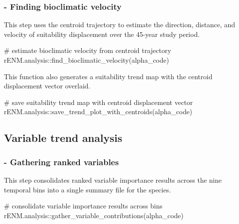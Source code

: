 \documentclass[
  letterpaper,
  DIV=11,
  numbers=noendperiod]{scrartcl}
\newenvironment{Shaded}{\begin{snugshade}}{\end{snugshade}}
\newcommand{\CommentTok}[1]{\textcolor[rgb]{0.37,0.37,0.37}{#1}}
\newcommand{\FunctionTok}[1]{\textcolor[rgb]{0.28,0.35,0.67}{#1}}
\newcommand{\NormalTok}[1]{\textcolor[rgb]{0.00,0.23,0.31}{#1}}
\newcommand{\SpecialCharTok}[1]{\textcolor[rgb]{0.37,0.37,0.37}{#1}}
\begin{document}
\subsubsection{- Finding bioclimatic
velocity}\label{finding-bioclimatic-velocity}

This step uses the centroid trajectory to estimate the direction,
distance, and velocity of suitability displacement over the 45-year
study period.

\begin{Shaded}
\begin{Highlighting}[]
\CommentTok{\# estimate bioclimatic velocity from centroid trajectory}
\NormalTok{rENM.analysis}\SpecialCharTok{::}\FunctionTok{find\_bioclimatic\_velocity}\NormalTok{(alpha\_code)}
\end{Highlighting}
\end{Shaded}

This function also generates a suitability trend map with the centroid
displacement vector overlaid.

\begin{Shaded}
\begin{Highlighting}[]
\CommentTok{\# save suitability trend map with centroid displacement vector}
\NormalTok{rENM.analysis}\SpecialCharTok{::}\FunctionTok{save\_trend\_plot\_with\_centroids}\NormalTok{(alpha\_code)}
\end{Highlighting}
\end{Shaded}

\subsection{Variable trend analysis}\label{variable-trend-analysis}

\subsubsection{- Gathering ranked
variables}\label{gathering-ranked-variables}

This step consolidates ranked variable importance results across the
nine temporal bins into a single summary file for the species.

\begin{Shaded}
\begin{Highlighting}[]
\CommentTok{\# consolidate variable importance results across bins}
\NormalTok{rENM.analysis}\SpecialCharTok{::}\FunctionTok{gather\_variable\_contributions}\NormalTok{(alpha\_code)}
\end{Highlighting}
\end{Shaded}
\end{document}
